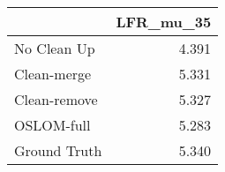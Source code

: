 \begin{tabular}{lr}
\toprule
{} & LFR_mu_35 \\
\midrule
No Clean Up  &     4.391 \\
Clean-merge  &     5.331 \\
Clean-remove &     5.327 \\
OSLOM-full   &     5.283 \\
Ground Truth &     5.340 \\
\bottomrule
\end{tabular}
